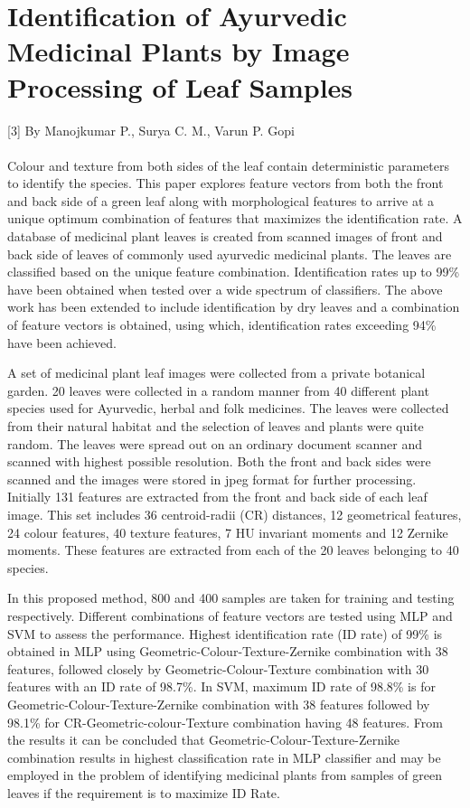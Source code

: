 \section{Identification of Ayurvedic Medicinal Plants by Image Processing of Leaf Samples }
[3] By Manojkumar P., Surya C. M., Varun P. Gopi
\paragraph{}
Colour and texture from both sides of the leaf contain
deterministic parameters to identify the species. This paper
explores feature vectors from both the front and back side of
a green leaf along with morphological features to arrive at a
unique optimum combination of features that maximizes the
identification rate. A database of medicinal plant leaves is created
from scanned images of front and back side of leaves of commonly
used ayurvedic medicinal plants. The leaves are classified based
on the unique feature combination. Identification rates up to
99\% have been obtained when tested over a wide spectrum
of classifiers. The above work has been extended to include
identification by dry leaves and a combination of feature vectors
is obtained, using which, identification rates exceeding 94\% have
been achieved.

A set of medicinal plant leaf images were collected from a private botanical
garden. 20 leaves were collected in a random manner from
40 different plant species used for Ayurvedic, herbal and folk
medicines. The leaves were collected from their natural habitat
and the selection of leaves and plants were quite random. The
leaves were spread out on an ordinary document scanner and
scanned with highest possible resolution. Both the front and
back sides were scanned and the images were stored in jpeg
format for further processing.\\

Initially 131 features are extracted from the front and back
side of each leaf image. This set includes 36 centroid-radii
(CR) distances, 12 geometrical features,
24 colour features, 40 texture features, 7 HU
invariant moments and 12 Zernike moments.
These features are extracted from each of the 20 leaves
belonging to 40 species.

In this proposed method, 800 and 400 samples are taken
for training and testing respectively. Different combinations
of feature vectors are tested using MLP and SVM to assess the performance. Highest
identification rate (ID rate) of 99\% is obtained in MLP
using Geometric-Colour-Texture-Zernike combination with 38
features, followed closely by Geometric-Colour-Texture combination with 30 features with an ID rate of 98.7\%. In SVM,
maximum ID rate of 98.8\% is for Geometric-Colour-Texture-Zernike combination with 38 features followed by 98.1\% for
CR-Geometric-colour-Texture combination having 48 features.
From the results it can be concluded that Geometric-Colour-Texture-Zernike combination results in highest classification
rate in MLP classifier and may be employed in the problem
of identifying medicinal plants from samples of green leaves
if the requirement is to maximize ID Rate.\\

